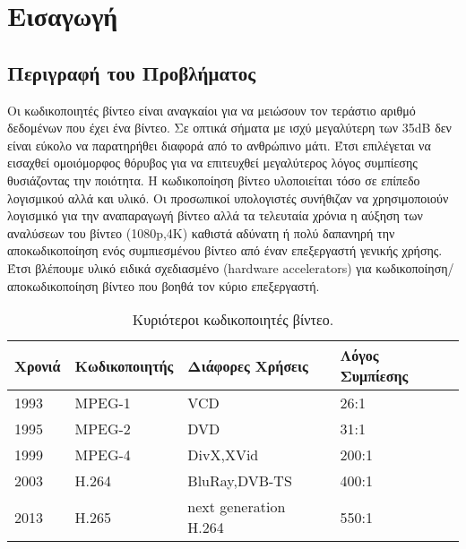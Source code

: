 ﻿\chapter{Εισαγωγή}
\label{chapter:chap1}

\section{Περιγραφή του Προβλήματος}
\label{section:sect11}
\indent
Οι κωδικοποιητές βίντεο είναι αναγκαίοι για να μειώσουν τον τεράστιο αριθμό δεδομένων που έχει ένα βίντεο. Σε οπτικά σήματα με ισχύ μεγαλύτερη των \si{35}{dB} δεν είναι εύκολο να παρατηρήθει διαφορά από το ανθρώπινο μάτι. Έτσι επιλέγεται να εισαχθεί ομοιόμορφος θόρυβος για να επιτευχθεί μεγαλύτερος λόγος συμπίεσης θυσιάζοντας την ποιότητα.
Η κωδικοποίηση βίντεο υλοποιείται τόσο σε επίπεδο λογισμικού αλλά και υλικό. Οι προσωπικοί υπολογιστές συνήθιζαν να χρησιμοποιούν λογισμικό για την αναπαραγωγή βίντεο αλλά τα τελευταία χρόνια η αύξηση των αναλύσεων του βίντεο (1080p,4K) καθιστά αδύνατη ή πολύ δαπανηρή την αποκωδικοποίηση ενός συμπιεσμένου βίντεο από έναν επεξεργαστή γενικής χρήσης. Έτσι βλέπουμε υλικό ειδικά σχεδιασμένο (hardware accelerators) για κωδικοποίηση/αποκωδικοποίηση βίντεο που βοηθά τον κύριο επεξεργαστή.

\begin{table}[h!]
    \begin{center}
        \begin{tabular}{| l | l | l | l |}
        \hline
        Χρονιά  & Κωδικοποιητής & Διάφορες Χρήσεις      & Λόγος Συμπίεσης           \\ \hline
        1993    & MPEG-1        &       VCD             &       26:1                \\ \hline
        1995    & MPEG-2        &       DVD             &       31:1                \\ \hline
        1999    & MPEG-4        &    DivX,XVid          &      200:1                \\ \hline
        2003    & H.264         & BluRay,DVB-TS         &      400:1                \\ \hline
        2013    & H.265         & next generation H.264 &      550:1                \\ \hline
        \hline
        \end{tabular}
    \end{center}

    \caption{Κυριότεροι κωδικοποιητές βίντεο. \cite{wiki:codecs}}
    \label{table:listofcodecs}
\end{table}

